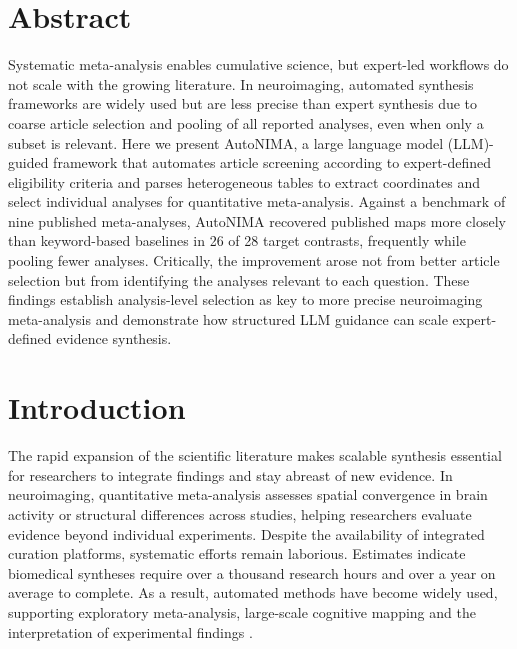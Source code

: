 \section{Abstract}

Systematic meta-analysis enables cumulative science, but expert-led workflows do not scale with the growing literature. In neuroimaging, automated synthesis frameworks are widely used but are less precise than expert synthesis due to coarse article selection and pooling of all reported analyses, even when only a subset is relevant. Here we present AutoNIMA, a large language model (LLM)-guided framework that automates article screening according to expert-defined eligibility criteria and parses heterogeneous tables to extract coordinates and select individual analyses for quantitative meta-analysis. Against a benchmark of nine published meta-analyses, AutoNIMA recovered published maps more closely than keyword-based baselines in 26 of 28 target contrasts, frequently while pooling fewer analyses. Critically, the improvement arose not from better article selection but from identifying the analyses relevant to each question. These findings establish analysis-level selection as key to more precise neuroimaging meta-analysis and demonstrate how structured LLM guidance can scale expert-defined evidence synthesis.

\section{Introduction}

The rapid expansion of the scientific literature makes scalable synthesis essential for researchers to integrate findings and stay abreast of new evidence\cite{Bornmann2021-qk}. In neuroimaging, quantitative meta-analysis assesses spatial convergence in brain activity or structural differences across studies\cite{Eickhoff2009-hf}, helping researchers evaluate evidence beyond individual experiments. Despite the availability of integrated curation platforms\cite{Kent2026-qb,Laird2005-qq}, systematic efforts remain laborious. Estimates indicate biomedical syntheses require over a thousand research hours\cite{Allen1999-pw} and over a year on average to complete\cite{Borah2017-nf}. As a result, automated methods have become widely used, supporting exploratory meta-analysis, large-scale cognitive mapping and the interpretation of experimental findings \cite{Yarkoni2011-hi,Dockes2020-ka,Poldrack2012-qk,De_la_Vega2016-qb,Rubin2017-nh}.

